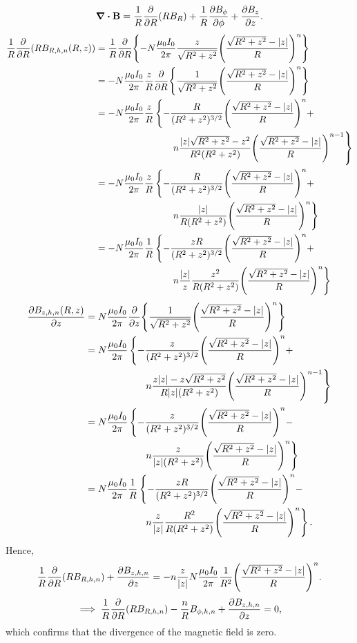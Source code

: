 \documentclass{article}
\let\vec\mathbf
\begin{document}
\[\div{\vec{B}}=\frac{1}{R}\frac{\partial}{\partial R}(RB_R) + \frac{1}{R}\frac{\partial B_\phi}{\partial \phi} + \pdv{B_z}{z}.\]
\[\begin{aligned}
\frac{1}{R}\frac{\partial}{\partial R}(RB_{R,h,n}(R,z)) &= \frac{1}{R}\frac{\partial}{\partial R}\qty{-N\frac{\mu_0 I_0}{2 \pi}\frac{z}{\sqrt{R^2+z^2}}\qty(\frac{\sqrt{R^2+z^2}-\abs{z}}{R})^n} \\
&= -N\frac{\mu_0 I_0}{2 \pi}\frac{z}{R}\frac{\partial}{\partial R}\qty{\frac{1}{\sqrt{R^2+z^2}}\qty(\frac{\sqrt{R^2+z^2}-\abs{z}}{R})^n} \\
&= -N\frac{\mu_0 I_0}{2 \pi}\frac{z}{R}\left\{-\frac{R}{(R^2+z^2)^{3/2}}\qty(\frac{\sqrt{R^2+z^2}-\abs{z}}{R})^n + \right. \\
&\qquad\qquad\qquad\qquad \left.n\frac{|z|\sqrt{R^2+z^2}-z^2}{R^2(R^2+z^2)}\qty(\frac{\sqrt{R^2+z^2}-\abs{z}}{R})^{n-1}\right\} \\
&= -N\frac{\mu_0 I_0}{2 \pi}\frac{z}{R}\left\{-\frac{R}{(R^2+z^2)^{3/2}}\qty(\frac{\sqrt{R^2+z^2}-\abs{z}}{R})^n + \right. \\
&\qquad\qquad\qquad\qquad \left.n\frac{|z|}{R(R^2+z^2)}\qty(\frac{\sqrt{R^2+z^2}-\abs{z}}{R})^{n}\right\} \\
&= -N\frac{\mu_0 I_0}{2 \pi}\frac{1}{R}\left\{-\frac{zR}{(R^2+z^2)^{3/2}}\qty(\frac{\sqrt{R^2+z^2}-\abs{z}}{R})^n + \right. \\
&\qquad\qquad\qquad\qquad \left.n\frac{|z|}{z}\frac{z^2}{R(R^2+z^2)}\qty(\frac{\sqrt{R^2+z^2}-\abs{z}}{R})^{n}\right\} \\
\end{aligned}\]
\[\begin{aligned}
    \pdv{B_{z,h,n}(R,z)}{z}&=N\frac{\mu_0 I_0}{2 \pi}\frac{\partial}{\partial z}\qty{\frac{1}{\sqrt{R^2+z^2}}\qty(\frac{\sqrt{R^2+z^2}-\abs{z}}{R})^n} \\ 
    &= N\frac{\mu_0 I_0}{2 \pi}\left\{-\frac{z}{(R^2+z^2)^{3/2}}\qty(\frac{\sqrt{R^2+z^2}-\abs{z}}{R})^n+\right. \\
    &\qquad\qquad\qquad\left.n\frac{z|z|-z\sqrt{R^2+z^2}}{R|z|(R^2+z^2)}\qty(\frac{\sqrt{R^2+z^2}-\abs{z}}{R})^{n-1}\right\} \\
    &= N\frac{\mu_0 I_0}{2 \pi}\left\{-\frac{z}{(R^2+z^2)^{3/2}}\qty(\frac{\sqrt{R^2+z^2}-\abs{z}}{R})^n-\right. \\
    &\qquad\qquad\qquad\left.n\frac{z}{|z|(R^2+z^2)}\qty(\frac{\sqrt{R^2+z^2}-\abs{z}}{R})^{n}\right\} \\
    &= N\frac{\mu_0 I_0}{2 \pi}\frac{1}{R}\left\{-\frac{zR}{(R^2+z^2)^{3/2}}\qty(\frac{\sqrt{R^2+z^2}-\abs{z}}{R})^n-\right. \\
    &\qquad\qquad\qquad\left.n\frac{z}{|z|}\frac{R^2}{R(R^2+z^2)}\qty(\frac{\sqrt{R^2+z^2}-\abs{z}}{R})^{n}\right\}.
\end{aligned}\]
Hence,
\[\begin{aligned}
    \frac{1}{R}\frac{\partial}{\partial R}(RB_{R,h,n}) + \pdv{B_{z,h,n}}{z} = -n\frac{z}{|z|}N\frac{\mu_0 I_0}{2 \pi}\frac{1}{R^2}\qty(\frac{\sqrt{R^2+z^2}-\abs{z}}{R})^{n}.
\end{aligned}\]
\[\implies \frac{1}{R}\frac{\partial}{\partial R}(RB_{R,h,n}) -\frac{n}{R}B_{\phi,h,n} + \pdv{B_{z,h,n}}{z} = 0,\]
which confirms that the divergence of the magnetic field is zero.
\end{document}
